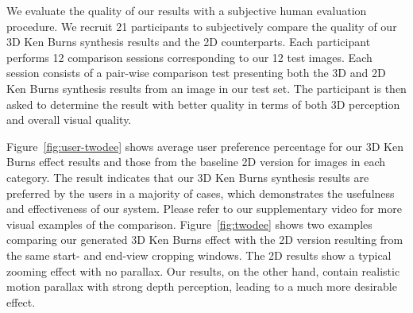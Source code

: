 \documentclass[acmtog,authorversion]{acmart}
\begin{document}
We evaluate the quality of our results with a subjective human evaluation procedure. We recruit 21 participants to subjectively compare the quality of our 3D Ken Burns synthesis results and the 2D counterparts. Each participant performs 12 comparison sessions corresponding to our 12 test images. Each session consists of a pair-wise comparison test presenting both the 3D and 2D Ken Burns synthesis results from an image in our test set. The participant is then asked to determine the result with better quality in terms of both 3D perception and overall visual quality.

Figure~\ref{fig:user-twodee} shows average user preference percentage for our 3D Ken Burns effect results and those from the baseline 2D version for images in each category. The result indicates that our 3D Ken Burns synthesis results are preferred by the users in a majority of cases, which demonstrates the usefulness and effectiveness of our system. Please refer to our supplementary video for more visual examples of the comparison. Figure~\ref{fig:twodee} shows two examples comparing our generated 3D Ken Burns effect with the 2D version resulting from the same start- and end-view cropping windows. The 2D results show a typical zooming effect with no parallax. Our results, on the other hand, contain realistic motion parallax with strong depth perception, leading to a much more desirable effect.
\end{document}
